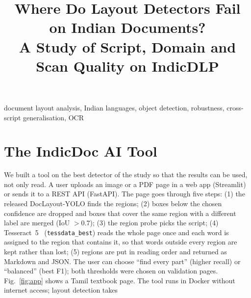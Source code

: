 \documentclass[conference]{IEEEtran}
\begin{document}
\title{Where Do Layout Detectors Fail on Indian Documents?\\ A Study of Script, Domain and Scan Quality on IndicDLP}

\author{
}

\maketitle

\begin{abstract}
\end{abstract}

\begin{IEEEkeywords}
document layout analysis, Indian languages, object detection, robustness, cross-script generalisation, OCR
\end{IEEEkeywords}



\section{The IndicDoc AI Tool}
We built a tool on the best detector of the study so that the results can be used, not only read. A user uploads
an image or a PDF page in a web app (Streamlit) or sends it to a REST API (FastAPI). The page goes through five
steps: (1) the released DocLayout-YOLO finds the regions; (2) boxes below the chosen confidence are dropped and
boxes that cover the same region with a different label are merged (IoU $>0.7$); (3) the region probe picks the
script; (4) Tesseract~5~\cite{tesseract} (\texttt{tessdata\_best}) reads the whole page once and each word is assigned to the region
that contains it, so that words outside every region are kept rather than lost; (5) regions are put in reading
order and returned as Markdown and JSON. The user can choose ``find every part'' (higher recall) or ``balanced''
(best F1); both thresholds were chosen on validation pages. Fig.~\ref{fig:app} shows a Tamil textbook page. The
tool runs in Docker without internet access; layout detection takes %
\end{document}
